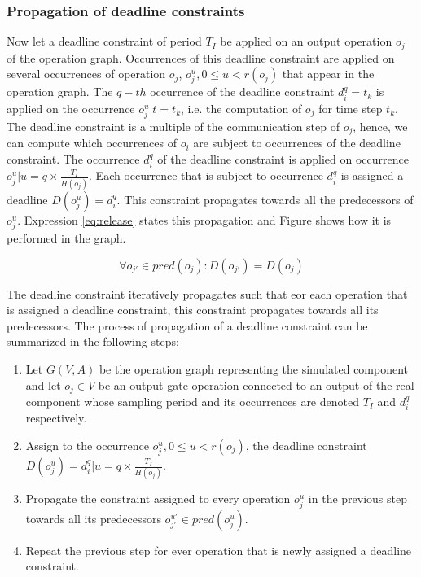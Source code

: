 \subsubsection{Propagation of deadline constraints}

Now let a deadline constraint of period $T_I$ be applied on an output operation $o_j$ of the operation graph. Occurrences of this deadline constraint are applied on several occurrences of operation $o_j$, $o^u_j, 0 \leq u < r(o_j)$ that appear in the operation graph. The $q-th$ occurrence of the deadline constraint $d_i^q = t_k$ is applied on the occurrence $o^u_j | t = t_k$, i.e. the computation of ${o_j}$ for time step $t_k$. The deadline constraint is a multiple of the communication step of $o_j$, hence, we can compute which occurrences of $o_i$ are subject to occurrences of the deadline constraint. The occurrence $d_i^q$ of the deadline constraint is applied on occurrence $o^u_j | u = q \times \frac{T_I}{H(o_j)}$. Each occurrence that is subject to occurrence $d_i^q$ is assigned a deadline $D(o_j^u) = d_i^q$. This constraint propagates towards all the predecessors of $o_j^u$. Expression \ref{eq:release} states this propagation and Figure shows how it is performed in the graph.

\begin{equation}
\forall o_{j'} \in pred(o_j): D(o_{j'}) = D(o_j)
\label{eq:release}
\end{equation}

The deadline constraint iteratively propagates such that eor each operation that is assigned a deadline constraint, this constraint propagates towards all its predecessors. The process of propagation of a deadline constraint can be summarized in the following steps:

\begin{enumerate}
\item Let $G(V,A)$ be the operation graph representing the simulated component and let $o_j \in  V$ be an output gate operation connected to an output of the real component whose sampling period and its occurrences are denoted $T_I$ and $d_i^q$ respectively.
\item Assign to the occurrence $o_j^u, 0 \leq u < r(o_j)$, the deadline constraint $D(o_j^u) = d_i^q | u = q \times \frac{T_I}{H(o_j)}$.
\item Propagate the constraint assigned to every operation $o_j^u$ in the previous step towards all its predecessors $o_{j'}^{u'} \in pred(o_j^u)$.
\item Repeat the previous step for ever operation that is newly assigned a deadline constraint.
\end{enumerate}

